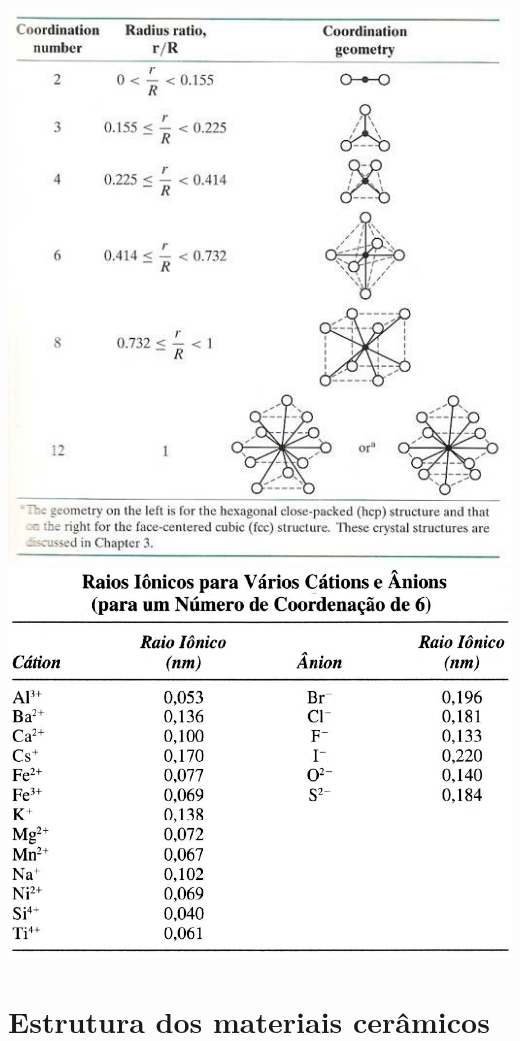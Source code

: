  \includegraphics[scale=0.4,trim={0 0 0 0}]{figures/RELraio}
 \includegraphics[scale=0.24,trim={0 0 0 0}]{figures/raio}
 

 \section{Estrutura dos materiais cerâmicos}
 
